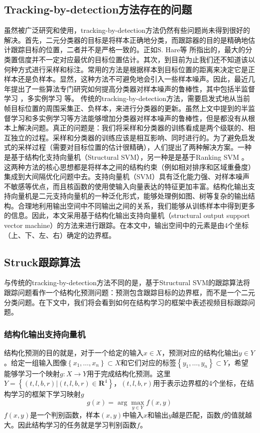 \subsection{Tracking-by-detection方法存在的问题}
虽然被广泛研究和使用，tracking-by-detection方法仍然有些问题尚未得到很好的解决。首先，二元分类器的目标是将样本正确地分类，而跟踪器的目的是精确地估计跟踪目标的位置，二者并不是严格一致的。正如S. Hare等 \cite{struck}所指出的，最大的分类置信度并不一定对应最优的目标位置估计。其次，到目前为止我们还不知道该以何种方式进行采样和标注。常用的方法是根据样本到目标位置的距离来决定它是正样本还是负样本。显然，这种方法不可避免地会引入一些样本噪声。因此，最近几年提出了一些算法专门研究如何提高分类器对样本噪声的鲁棒性，其中包括半监督学习 \cite{boost-track} \cite{multi-view}，多实例学习 \cite{mil} \cite{mib}等。
传统的tracking-by-detection方法，需要启发式地从当前帧目标位置的周围采集正、负样本，来进行分类器的更新。虽然上文中提到的半监督学习和多实例学习等方法能够增加分类器对样本噪声的鲁棒性，但是都没有从根本上解决问题。真正的问题是：我们将采样和分类器的训练看成是两个级联的、相互独立的过程。采样和分类器的训练应该是相互影响、同时进行的。为了避免启发式的采样过程（需要对目标位置的估计很精确），人们提出了两种解决方案。一种是基于结构化支持向量机（Structural SVM）\cite{struck}，另一种是是基于Ranking SVM \cite{rank-svm}。这两种方法的核心思想都是将样本之间的结构约束（例如相对排序和区域重叠度）集成到大间隔优化问题中去。支持向量机（SVM）具有泛化能力强、对样本噪声不敏感等优点，而且核函数的使用使输入向量表达的特征更加丰富。结构化输出支持向量机是二元支持向量机的一种泛化形式，能够处理例如图、树等复杂的输出结构。合理地利用输出空间中不同输出之间的关系，我们能够从训练样本中得到更多的信息。因此，本文采用基于结构化输出支持向量机（structural output support vector machine）的方法来进行跟踪。在本文中，输出空间中的元素是由4个坐标（上、下、左、右）确定的边界框。

\subsection{Struck跟踪算法}
与传统的tracking-by-detection方法不同的是，基于Structural SVM的跟踪算法将跟踪问题看作一个结构化预测问题：预测包含跟踪目标的边界框，而不是一个二元分类问题。在下文中，我们将会看到如何在结构学习的框架中表述视频目标跟踪问题。

\subsubsection{结构化输出支持向量机}
结构化预测的目的就是，对于一个给定的输入$x \in X$，预测对应的结构化输出$y \in Y$。给定一组输入图像$\left\{x_1,\dots,x_n\right\} \subset X$和它们对应的标签$\left\{y_1,\dots,y_n\right\} \subset Y$，希望能够学习一个映射$g:X \rightarrow Y$用于完成结构化预测。这里$Y=\left\{(t,l,b,r)|(t,l,b,r) \in \textbf{R}^4\right\}$，$(t,l,b,r)$用于表示边界框的4个坐标，在结构学习的框架下学习映射$g$
\begin{equation}
g(x)=\arg \max_{y \in Y}{f(x,y)}
\end{equation}
$f(x,y)$是一个判别函数，样本$(x,y)$中输入$x$和输出$y$越是匹配，函数$f$的值就越大。因此结构学习的任务就是学习判别函数$f$。

